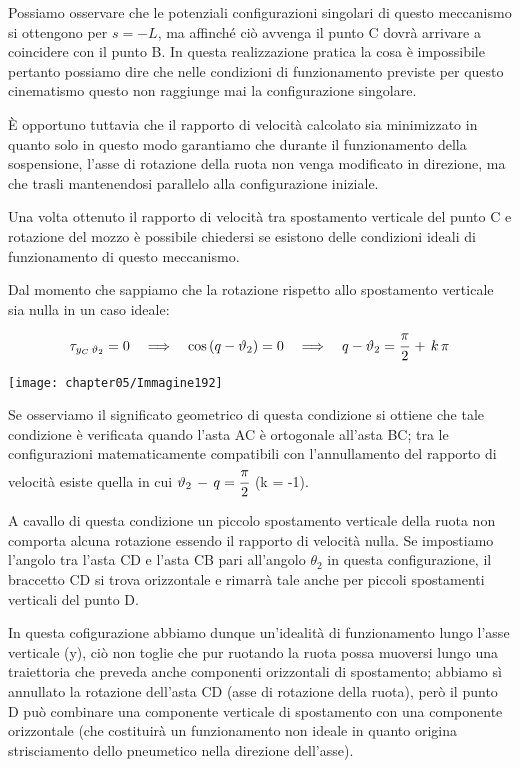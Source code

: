 Possiamo osservare che le potenziali configurazioni singolari di questo meccanismo si ottengono per $s = - L$, ma affinché ciò avvenga il punto C dovrà arrivare a coincidere con il punto B. In questa realizzazione pratica la cosa è impossibile pertanto possiamo dire che nelle condizioni di funzionamento previste per questo cinematismo questo non raggiunge mai la configurazione singolare.

È opportuno tuttavia che il rapporto di velocità calcolato sia minimizzato in quanto solo in questo modo garantiamo che durante il funzionamento della sospensione, l'asse di rotazione della ruota non venga modificato in direzione, ma che trasli mantenendosi parallelo alla configurazione iniziale.

Una volta ottenuto il rapporto di velocità tra spostamento verticale del punto C e rotazione del mozzo è possibile chiedersi se esistono delle condizioni ideali di funzionamento di questo meccanismo.

Dal momento che sappiamo che la rotazione rispetto allo spostamento verticale sia nulla in un caso ideale:
\[\tau_{y_C\,\theta_2} = 0 \quad\Longrightarrow\quad \cos{(q-\theta_2)} = 0 \quad\Longrightarrow\quad q-\theta_2 = \cfrac{\pi}{2}\,+\,k\,\pi\] 

\begin{center}
\texttt{[image: chapter05/Immagine192]}
\end{center}

Se osserviamo il significato geometrico di questa condizione si ottiene che tale condizione è verificata quando l'asta AC è ortogonale all'asta BC; tra le configurazioni matematicamente compatibili con l'annullamento del rapporto di velocità esiste quella in cui $\theta_2\,-\,q = \cfrac{\pi}{2}$ (k = -1).

A cavallo di questa condizione un piccolo spostamento verticale della ruota non comporta alcuna rotazione essendo il rapporto di velocità nulla. Se impostiamo l'angolo tra l'asta CD e l'asta CB pari all'angolo $\theta_2$ in questa configurazione, il braccetto CD si trova orizzontale e rimarrà tale anche per piccoli spostamenti verticali del punto D.

In questa cofigurazione abbiamo dunque un'idealità di funzionamento lungo l'asse verticale (y), ciò non toglie che pur ruotando la ruota possa muoversi lungo una traiettoria che preveda anche componenti orizzontali di spostamento; abbiamo sì annullato la rotazione dell'asta CD (asse di rotazione della ruota), però il punto D può combinare una componente verticale di spostamento con una componente orizzontale (che costituirà un funzionamento non ideale in quanto origina strisciamento dello pneumetico nella direzione dell'asse).

